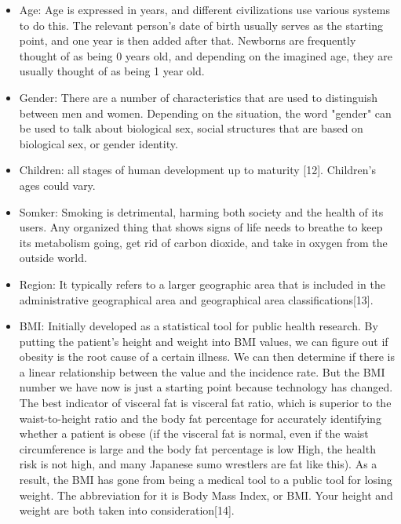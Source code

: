 \documentclass[journal]{IEEEtran}
\begin{document}
\begin{itemize}

\item Age: Age is expressed in years, and different civilizations use various systems to do this. The relevant person's date of birth usually serves as the starting point, and one year is then added after that. Newborns are frequently thought of as being 0 years old, and depending on the imagined age, they are usually thought of as being 1 year old.

\item Gender: There are a number of characteristics that are used to distinguish between men and women. Depending on the situation, the word "gender" can be used to talk about biological sex, social structures that are based on biological sex, or gender identity.


\item Children: all stages of human development up to maturity [12]. Children's ages could vary.

\item Somker: Smoking is detrimental, harming both society and the health of its users. Any organized thing that shows signs of life needs to breathe to keep its metabolism going, get rid of carbon dioxide, and take in oxygen from the outside world.

\item Region: It typically refers to a larger geographic area that is included in the administrative geographical area and geographical area classifications[13].

\item BMI: Initially developed as a statistical tool for public health research. By putting the patient's height and weight into BMI values, we can figure out if obesity is the root cause of a certain illness. We can then determine if there is a linear relationship between the value and the incidence rate. But the BMI number we have now is just a starting point because technology has changed. The best indicator of visceral fat is visceral fat ratio, which is superior to the waist-to-height ratio and the body fat percentage for accurately identifying whether a patient is obese (if the visceral fat is normal, even if the waist circumference is large and the body fat percentage is low High, the health risk is not high, and many Japanese sumo wrestlers are fat like this). As a result, the BMI has gone from being a medical tool to a public tool for losing weight. The abbreviation for it is Body Mass Index, or BMI. Your height and weight are both taken into consideration[14].

\end{itemize}
\end{document}
